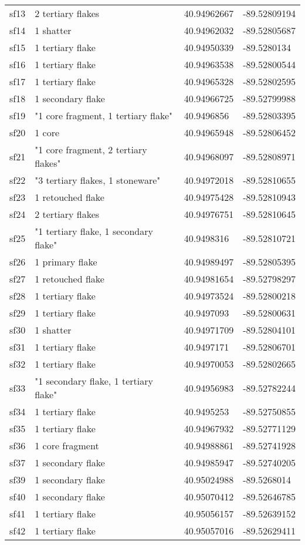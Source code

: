 \begin{longtable}{p{1cm}p{6cm}ll}
	sf13 & 2 tertiary flakes & 40.94962667 & -89.52809194\\
	sf14 & 1 shatter & 40.94962032 & -89.52805687\\
	sf15 & 1 tertiary flake & 40.94950339 & -89.5280134\\
	sf16 & 1 tertiary flake & 40.94963538 & -89.52800544\\
	sf17 & 1 tertiary flake & 40.94965328 & -89.52802595\\
	sf18 & 1 secondary flake & 40.94966725 & -89.52799988\\
	sf19 & "1 core fragment, 1 tertiary flake" & 40.9496856 & -89.52803395\\
	sf20 & 1 core & 40.94965948 & -89.52806452\\
	sf21 & "1 core fragment, 2 tertiary flakes" & 40.94968097 & -89.52808971\\
	sf22 & "3 tertiary flakes, 1 stoneware" & 40.94972018 & -89.52810655\\
	sf23 & 1 retouched flake & 40.94975428 & -89.52810943\\
	sf24 & 2 tertiary flakes & 40.94976751 & -89.52810645\\
	sf25 & "1 tertiary flake, 1 secondary flake" & 40.9498316 & -89.52810721\\
	sf26 & 1 primary flake & 40.94989497 & -89.52805395\\
	sf27 & 1 retouched flake & 40.94981654 & -89.52798297\\
	sf28 & 1 tertiary flake & 40.94973524 & -89.52800218\\
	sf29 & 1 tertiary flake & 40.9497093 & -89.52800631\\
	sf30 & 1 shatter & 40.94971709 & -89.52804101\\
	sf31 & 1 tertiary flake & 40.9497171 & -89.52806701\\
	sf32 & 1 tertiary flake & 40.94970053 & -89.52802665\\
	sf33 & "1 secondary flake, 1 tertiary flake" & 40.94956983 & -89.52782244\\
	sf34 & 1 tertiary flake & 40.9495253 & -89.52750855\\
	sf35 & 1 tertiary flake & 40.94967932 & -89.52771129\\
	sf36 & 1 core fragment & 40.94988861 & -89.52741928\\
	sf37 & 1 secondary flake & 40.94985947 & -89.52740205\\

	sf39 & 1 secondary flake & 40.95024988 & -89.5268014\\
	sf40 & 1 secondary flake & 40.95070412 & -89.52646785\\
	sf41 & 1 tertiary flake & 40.95056157 & -89.52639152\\
	sf42 & 1 tertiary flake & 40.95057016 & -89.52629411\\


\end{longtable}
